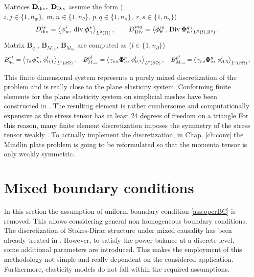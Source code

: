 Matrices $\mathbf{D}_{\div}, \; \mathbf{D}_{\Div}$ assume the form ($i, j \in \{1, n_w\}, \; m, n \in \{1, n_\theta\}, \, p, q \in \{1, n_\kappa\}, \; r, s \in \{1, n_\gamma\}$)
\begin{equation}
D_{\div}^{is} = \inner[L^2(\Omega)]{\phi_w^i}{\div \bm\phi_\gamma^s}, \qquad D_{\Div}^{mq} = \inner[L^2(\Omega, \mathbb{R}^2)]{\bm\phi_\theta^m}{\Div \bm\Phi_\kappa^q}.
\end{equation}
Matrix $\mathbf{B}_{q_n}, \, \mathbf{B}_{M_{nn}}, \, \mathbf{B}_{M_{ns}}$ are computed as ($l \in \{1, n_\partial\}$)
\begin{equation}
{B}_{q_n}^{rl} = \inner[L^2(\partial\Omega)]{\gamma_n \bm\phi_\gamma^r}{\phi_{\partial, 1}^l}, \quad {B}_{M_{nn}}^{pl} = \inner[L^2(\partial\Omega)]{\gamma_{nn} \bm\Phi_\kappa^p}{\phi_{\partial, 2}^l},  \quad {B}_{M_{ns}}^{pl} = \inner[L^2(\partial\Omega)]{\gamma_{ns} \bm\Phi_\kappa^p}{\phi_{\partial, 3}^l}.
\end{equation}

This finite dimensional system represents a purely mixed discretization of the problem and is really close to the plane elasticity system. Conforming finite elements for the plane elasticity system on simplicial meshes have been constructed in \cite{arnold2002mixed}. The resulting element is rather cumbersome and computationally expensive as the stress tensor has at least 24 degrees of freedom on a triangle  For this reason, many finite element discretization imposes the symmetry of the stress tensor weakly \cite{arnold2007mixed}. To actually implement the discretization, in Chap. \ref{ch:conv} the Mindlin plate problem is going to be reformulated so that the momenta tensor is only weakly symmetric. 


\section{Mixed boundary conditions}\label{sec:mixedbc}
In this section the assumption of uniform boundary condition \ref{ass:operBC} is removed. This allows considering general non homogeneous boundary conditions. The discretization of Stokes-Dirac structure under mixed causality has been already treated in \cite{kotyczka2018weak}. However, to satisfy the power balance at a discrete level, some additional parameters are introduced. This makes the employment of this methodology not simple and really dependent on the considered application. Furthermore, elasticity models do not fall within the required assumptions. \\

